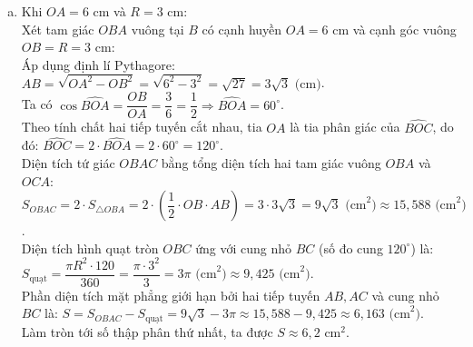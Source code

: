 \begin{bt}
{\begin{enumerate}[a)]
    Ta có $OE \perp AD$ tại $G$, và $BD \perp DE$ cần chứng minh.\\
    Xét $\triangle BCD$ vuông tại $C$ có $CD \perp BC$, suy ra trong tam giác vuông $BDE$ (nếu $DE$ là tiếp tuyến):\\
    Ta có $\widehat{ODE} = 90^\circ \Leftrightarrow DE \perp OD$.\\
    Thật vậy, xét $\triangle OAD$ và các tam giác liên quan, ta có $OG \perp AD$ và $BC \perp OA$ tại $H$, suy ra $O$ là trực tâm hoặc giao điểm các đường cao.\\
    Từ $\triangle BCD$ vuông tại $C$ có $CD \perp BE$. Mặt khác $AH \perp BE$ và $OG \perp AD$, suy ra $\widehat{EDB} = 90^\circ$.\\
    Vậy $DE \perp BD$ tại điểm $D$ thuộc đường tròn $(O)$, do đó $DE$ là tiếp tuyến của $(O)$.
    \item Khi $OA = 6\text{ cm}$ và $R = 3\text{ cm}$:\\
    Xét tam giác $OBA$ vuông tại $B$ có cạnh huyền $OA = 6\text{ cm}$ và cạnh góc vuông $OB = R = 3\text{ cm}$:\\
    Áp dụng định lí Pythagore:
    $AB = \sqrt{OA^2 - OB^2} = \sqrt{6^2 - 3^2} = \sqrt{27} = 3\sqrt{3}\text{ (cm)}$.\\
    Ta có $\cos \widehat{BOA} = \dfrac{OB}{OA} = \dfrac{3}{6} = \dfrac{1}{2} \Rightarrow \widehat{BOA} = 60^\circ$.\\
    Theo tính chất hai tiếp tuyến cắt nhau, tia $OA$ là tia phân giác của $\widehat{BOC}$, do đó:
    $\widehat{BOC} = 2 \cdot \widehat{BOA} = 2 \cdot 60^\circ = 120^\circ$.\\
    Diện tích tứ giác $OBAC$ bằng tổng diện tích hai tam giác vuông $OBA$ và $OCA$:
    $S_{OBAC} = 2 \cdot S_{\triangle OBA} = 2 \cdot \left(\dfrac{1}{2} \cdot OB \cdot AB\right) = 3 \cdot 3\sqrt{3} = 9\sqrt{3}\text{ (cm}^2\text{)} \approx 15{,}588\text{ (cm}^2\text{)}$.\\
    Diện tích hình quạt tròn $OBC$ ứng với cung nhỏ $BC$ (số đo cung $120^\circ$) là:
    $S_{\text{quạt}} = \dfrac{\pi R^2 \cdot 120}{360} = \dfrac{\pi \cdot 3^2}{3} = 3\pi\text{ (cm}^2\text{)} \approx 9{,}425\text{ (cm}^2\text{)}$.\\
    Phần diện tích mặt phẳng giới hạn bởi hai tiếp tuyến $AB, AC$ và cung nhỏ $BC$ là:
    $S = S_{OBAC} - S_{\text{quạt}} = 9\sqrt{3} - 3\pi \approx 15{,}588 - 9{,}425 \approx 6{,}163\text{ (cm}^2\text{)}$.\\
    Làm tròn tới số thập phân thứ nhất, ta được $S \approx 6{,}2\text{ cm}^2$.
\end{enumerate}
}
\end{bt}

